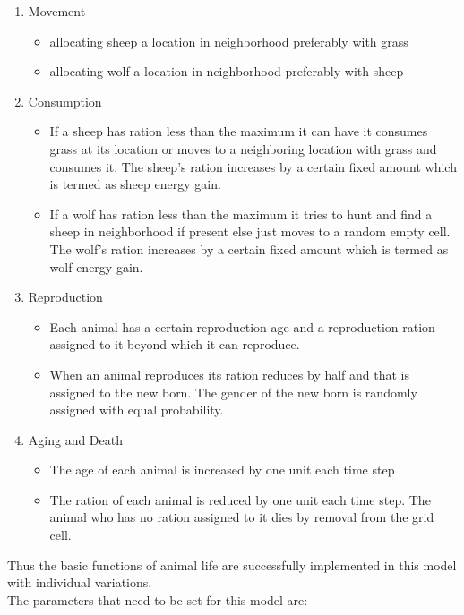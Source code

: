 \documentclass[prl,12pt,citeautoscript,reprint]{revtex4-1}
\begin{document}
\begin{enumerate}

 \item Movement
 \begin{itemize}	 
 \item allocating sheep a location in neighborhood preferably with grass 
 \item allocating wolf a location in neighborhood preferably with sheep    
 \end{itemize}
 
  \item Consumption
  \begin{itemize}
  	\item If a sheep has ration less than the maximum it can have it consumes grass at its location or moves to a neighboring location with grass and consumes it. The sheep's ration increases by a certain fixed amount which is termed as sheep energy gain.
  	\item If a wolf has ration less than the maximum it tries to hunt and find  a sheep in neighborhood if present else just moves to a random empty cell. The wolf's ration increases by a certain fixed amount which is termed as wolf energy gain.
  \end{itemize}
  \item Reproduction
  \begin{itemize}
  \item Each animal has a certain reproduction age and a reproduction ration assigned to it beyond which it can reproduce.
  \item When an animal reproduces its ration reduces by half and that is assigned to the new born. The gender of the new born is randomly assigned with equal probability.    
  \end{itemize}
  \item Aging and Death
  \begin{itemize}
  \item The age of each animal is increased by one unit each time step
  \item The ration of each animal is reduced by one unit each time step. The animal who has no ration assigned to it dies by removal from  the grid cell.	  
\end{itemize}  	  
\end{enumerate}
 Thus the basic functions of animal life are successfully implemented in this model with individual variations.
\\ 
 The parameters that need to be set for this model are:
\end{document}
